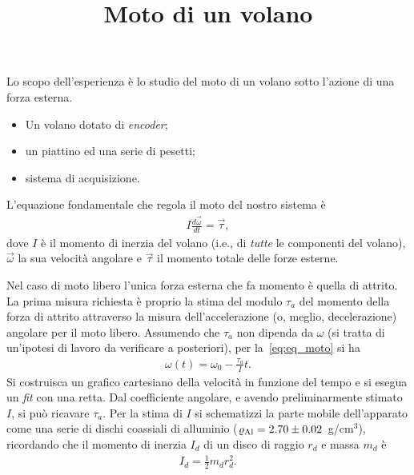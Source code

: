 \documentclass{lab1-article}
\title{Moto di un volano}
\begin{document}
\begin{article}

\maketitle

\secsummary

Lo scopo dell'esperienza \`e lo studio del moto di un volano sotto l'azione
di una forza esterna.

\secmaterials

\begin{itemize}
\item Un volano dotato di \emph{encoder};
\item un piattino ed una serie di pesetti;
\item sistema di acquisizione.
\end{itemize}

\secmeasurements

L'equazione fondamentale che regola il moto del nostro sistema \`e
\begin{align}\label{eq:eq_moto}
  I \frac{d\overrightarrow\omega}{dt} = \overrightarrow\tau,
\end{align}
dove $I$ \`e il momento di inerzia del volano (i.e., di \emph{tutte} le
componenti del volano), $\overrightarrow\omega$ la sua velocit\`a angolare e
$\overrightarrow\tau$ il momento totale delle forze esterne.



Nel caso di moto libero l'unica forza esterna che fa momento \`e quella di
attrito. La prima misura richiesta \`e proprio la stima del modulo $\tau_a$
del momento della forza di attrito attraverso la misura
dell'accelerazione (o, meglio, decelerazione) angolare per il moto
libero. Assumendo che $\tau_a$ non dipenda da $\omega$ (si tratta di un'ipotesi
di lavoro da verificare a posteriori), per la~\eqref{eq:eq_moto} si ha
\begin{align}
  \omega(t) = \omega_0 - \frac{\tau_a}{I}t.
\end{align}
Si costruisca un grafico cartesiano della velocit\`a in funzione del tempo e si
esegua un \emph{fit} con una retta. Dal coefficiente angolare, e avendo
preliminarmente stimato $I$, si pu\`o ricavare $\tau_a$.
Per la stima di $I$ si schematizzi la parte mobile dell'apparato come una serie
di dischi coassiali di alluminio ($\varrho_{\rm Al} = 2.70 \pm 0.02$~g/cm$^3$),
ricordando che il momento di inerzia $I_d$ di un disco di raggio $r_d$ e massa
$m_d$ \`e
\begin{align}
  I_d = \frac{1}{2}m_dr_d^2.
\end{align}


\end{article}
\end{document}
